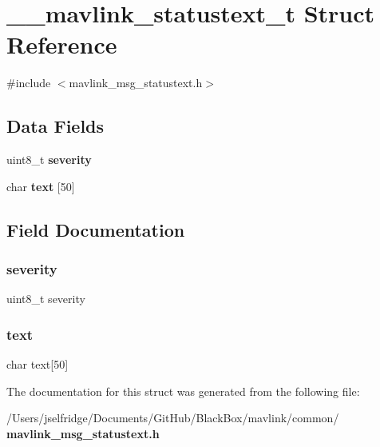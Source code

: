 \section{\+\_\+\+\_\+mavlink\+\_\+statustext\+\_\+t Struct Reference}
\label{struct____mavlink__statustext__t}


{\ttfamily \#include $<$mavlink\+\_\+msg\+\_\+statustext.\+h$>$}

\subsection*{Data Fields}
\begin{DoxyCompactItemize}
\item 
uint8\+\_\+t \textbf{ severity}
\item 
char \textbf{ text} [50]
\end{DoxyCompactItemize}


\subsection{Field Documentation}
\mbox{\label{struct____mavlink__statustext__t_abeed1da1d25cc4a17c78c569323bfffd}} 
\subsubsection{severity}
{\footnotesize\ttfamily uint8\+\_\+t severity}

\mbox{\label{struct____mavlink__statustext__t_ad2539ff4fdff2f9713c37cca32c87b0d}} 
\subsubsection{text}
{\footnotesize\ttfamily char text[50]}



The documentation for this struct was generated from the following file\+:\begin{DoxyCompactItemize}
\item 
/\+Users/jselfridge/\+Documents/\+Git\+Hub/\+Black\+Box/mavlink/common/\textbf{ mavlink\+\_\+msg\+\_\+statustext.\+h}\end{DoxyCompactItemize}
